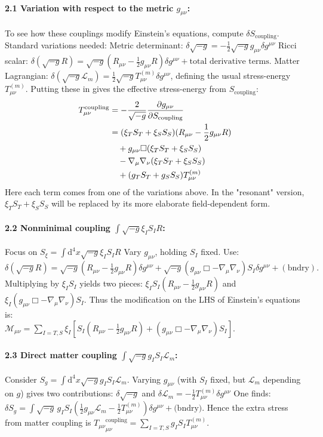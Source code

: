 \documentclass[11pt,a4paper]{article}
\newcommand{\Mmu}{\mathcal{M}}
\newcommand{\ST}{S_T}
\newcommand{\SSp}{S_S}
\newcommand{\Scoupling}{S_{\text{coupling}}}
\newcommand{\Lm}{\mathcal{L}_m}
\newcommand{\Tmu}{T_{\mu\nu}}
\newcommand{\Tmnm}{T_{\mu\nu}^{(m)}}
\newcommand{\Tmncoupling}{T^{\text{coupling}}_{\mu\nu}}
\begin{document}
\paragraph{2.1 Variation with respect to the metric $g_{\mu\nu}$:}
To see how these couplings modify Einstein's equations, compute $\delta\Scoupling$. Standard variations needed:
Metric determinant: $\delta\sqrt{-g}=-\frac{1}{2}\sqrt{-g}g_{\mu\nu}\delta g^{\mu\nu}$
Ricci scalar: $\delta(\sqrt{-g}R)=\sqrt{-g}(R_{\mu\nu}-\frac{1}{2}g_{\mu\nu}R)\delta g^{\mu\nu}+ \text{total derivative terms}.$
Matter Lagrangian: $\delta(\sqrt{-g}\Lm)=\frac{1}{2}\sqrt{-g}\Tmnm\delta g^{\mu\nu}$, defining the usual stress-energy $\Tmnm$.
Putting these in gives the effective stress-energy from $\Scoupling$:
\begin{align*}
\Tmncoupling &= -\frac{2}{\sqrt{-g}}\pdv{g_{\mu\nu}}{\Scoupling}\\
&=(\xi_T\ST+\xi_S\SSp)(R_{\mu\nu}-\frac{1}{2}g_{\mu\nu}R)\\
&\quad +g_{\mu\nu}\Box(\xi_T\ST+\xi_S\SSp)\\
&\quad -\nabla_\mu\nabla_\nu(\xi_T\ST+\xi_S\SSp)\\
&\quad +(g_T\ST+g_S\SSp)\Tmnm
\end{align*}
Here each term comes from one of the variations above. In the "resonant" version, $\xi_T\ST+\xi_S\SSp$ will be replaced by its more elaborate field-dependent form.

\paragraph{2.2 Nonminimal coupling $\int\sqrt{-g}\xi_I S_I R$:}
Focus on $S_\xi=\int\text{d}^4x\sqrt{-g}\xi_I S_I R$
Vary $g_{\mu\nu}$, holding $S_I$ fixed. Use:
$\delta(\sqrt{-g}R)=\sqrt{-g}(R_{\mu\nu}-\frac{1}{2}g_{\mu\nu}R)\delta g^{\mu\nu}+\sqrt{-g}(g_{\mu\nu}\Box-\nabla_\mu\nabla_\nu)S_I\delta g^{\mu\nu}+(\text{bndry}).$
Multiplying by $\xi_I S_I$ yields two pieces:
$\xi_I S_I(R_{\mu\nu}-\frac{1}{2}g_{\mu\nu}R)$
and $\xi_I(g_{\mu\nu}\Box-\nabla_\mu\nabla_\nu)S_I$.
Thus the modification on the LHS of Einstein's equations is: \\
$\Mmu_{\mu\nu}=\sum_{I=T,S}\xi_I\left[S_I(R_{\mu\nu}-\frac{1}{2}g_{\mu\nu}R)+(g_{\mu\nu}\Box-\nabla_\mu\nabla_\nu)S_I\right].$

\paragraph{2.3 Direct matter coupling $\int\sqrt{-g}g_I S_I\Lm$:}
Consider $S_g=\int\text{d}^4x\sqrt{-g}g_I S_I\Lm$.
Varying $g_{\mu\nu}$ (with $S_I$ fixed, but $\Lm$ depending on $g$) gives two contributions:
$\delta\sqrt{-g}$
and $\delta\Lm=-\frac{1}{2}\Tmnm\delta g^{\mu\nu}$
One finds:
$\delta S_g=\int\sqrt{-g}\,g_I S_I\left(\frac{1}{2}g_{\mu\nu}\Lm-\frac{1}{2}\Tmnm\right)\delta g^{\mu\nu} +\text{(bndry)}.$
Hence the extra stress from matter coupling is
${\Tmu}^{\text{coupling}}_{\mu\nu}=\sum_{I=T,S}g_I S_I\Tmnm.$
\end{document}
